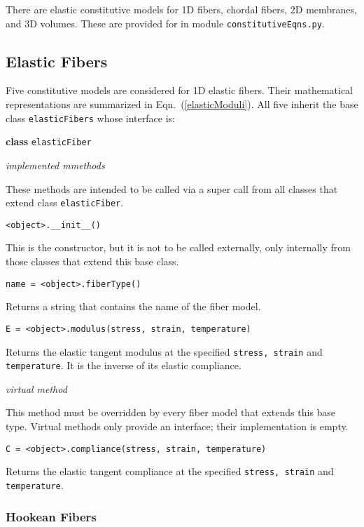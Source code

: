 \label{appModels}

There are elastic constitutive models for 1D fibers, chordal fibers, 2D membranes, and 3D volumes.  These are provided for in module \texttt{constitutiveEqns.py}.

\subsection{Elastic Fibers}
\label{appElasticFibers}

Five constitutive models are considered for 1D elastic fibers.  Their mathematical representations are summarized in Eqn.~(\ref{elasticModuli}).  All five inherit the base class \texttt{elasticFibers} whose interface is:

\medskip\noindent
\textbf{class} \texttt{elasticFiber}

\bigskip\noindent
\textit{implemented mmethods}

\bigskip\noindent
These methods are intended to be called via a super call from all classes that extend class \texttt{elasticFiber}.  

\bigskip\noindent
\texttt{<object>.\_\_init\_\_()}
    
\medskip\noindent
This is the constructor, but it is not to be called externally, only internally from those classes that extend this base class.

\bigskip\noindent
\texttt{name = <object>.fiberType()}

\medskip\noindent
Returns a string that contains the name of the fiber model.

\medskip\noindent
\texttt{E = <object>.modulus(stress, strain, temperature)}

\medskip\noindent
Returns the elastic tangent modulus at the specified \texttt{stress, strain} and \texttt{temperature}.  It is the inverse of its elastic compliance.

\bigskip\noindent
\textit{virtual method}

\bigskip\noindent
This method must be overridden by every fiber model that extends this base type.  Virtual methods only provide an interface; their implementation is empty. 

\medskip\noindent
\texttt{C = <object>.compliance(stress, strain, temperature)}

\medskip\noindent
Returns the elastic tangent compliance at the specified \texttt{stress, strain} and \texttt{temperature}.


\subsubsection{Hookean Fibers}

